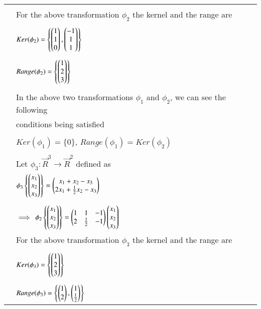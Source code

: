\documentclass[journal,12pt]{IEEEtran}
\begin{document}
\begin{longtable}{|l|l|}
		& \\
		& For the above transformation $\phi_2$ the kernel and the range are \\
		& \\
		& \qquad \qquad $Ker(\phi_2) = \left\{ \begin{pmatrix}1 \\ 1 \\ 0\end{pmatrix}, \begin{pmatrix}-1 \\ 1 \\ 1\end{pmatrix}\right\}$ \\
		& \\
		& \qquad \qquad $Range(\phi_2) = \left\{\begin{pmatrix}1 \\ 2 \\ 3\end{pmatrix}\right\}$ \\
		& \\
		& In the above two transformations $\phi_1$ and $\phi_2$, we can see the following \\
		& conditions being satisfied \\
		& \\
		& \qquad \qquad \qquad $Ker(\phi_1) = \{0\}$, $Range(\phi_1) = Ker(\phi_2)$ \\
		& \\
		& Let $\phi_3 : \vec{R}^{3} \rightarrow \vec{R}^{2}$ defined as \\ 
		& \qquad \qquad \qquad $\phi_3 \left\{ \begin{pmatrix}x_1 \\ x_2 \\ x_3\end{pmatrix}\right\} = \begin{pmatrix}x_1 + x_2 - x_3 \\ 2x_1 + \frac{1}{2}x_2 - x_3\end{pmatrix}$ \qquad \qquad \\
		& \\
		& \qquad \qquad $\implies$ $\phi_2 \left\{ \begin{pmatrix}x_1 \\ x_2 \\ x_3\end{pmatrix}\right\} = \begin{pmatrix}1&1&-1 \\ 2&\frac{1}{2}&-1\end{pmatrix}\begin{pmatrix}x_1 \\ x_2 \\ x_3\end{pmatrix}$\\
		& For the above transformation $\phi_3$ the kernel and the range are \\
		& \\
		& \qquad \qquad $Ker(\phi_3) = \left\{\begin{pmatrix}1 \\ 2 \\ 3\end{pmatrix}\right\}$ \\
		& \\
		& \qquad \qquad $Range(\phi_3) = \left\{\begin{pmatrix}1 \\ 2\end{pmatrix}, \begin{pmatrix}1 \\ \frac{1}{2}\end{pmatrix}\right\}$ \\

\end{longtable}
\end{document}
